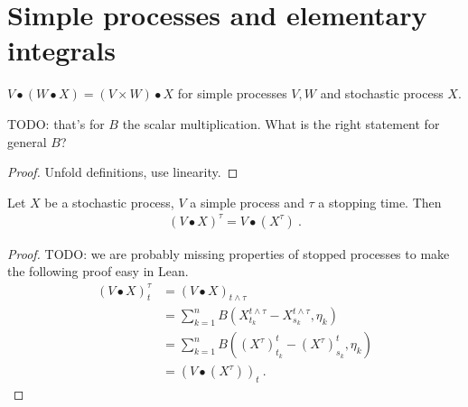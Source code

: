 \chapter{Simple processes and elementary integrals}




































\begin{lemma}\label{lem:elemStochIntegral_assoc}
$V \bullet (W \bullet X) = (V \times W) \bullet X$ for simple processes $V, W$ and stochastic process $X$.

TODO: that's for $B$ the scalar multiplication. What is the right statement for general $B$?
\end{lemma}

\begin{proof}
Unfold definitions, use linearity.
\end{proof}


\begin{lemma}\label{lem:elemStochIntegral_stoppedProcess}
Let $X$ be a stochastic process, $V$ a simple process and $τ$ a stopping time.
Then
\begin{align*}
  (V \bullet X)^τ = V \bullet (X^τ)
  \: .
\end{align*}
\end{lemma}

\begin{proof}
TODO: we are probably missing properties of stopped processes to make the following proof easy in Lean.
\begin{align*}
  (V \bullet X)^\tau_t
  &= (V \bullet X)_{t \wedge \tau}
  \\
  &= \sum_{k=1}^{n} B (X^{t \wedge \tau}_{t_k} - X^{t \wedge \tau}_{s_k}, \eta_k)
  \\
  &= \sum_{k=1}^{n} B ((X^{\tau})^t_{t_k} - (X^{\tau})^t_{s_k}, \eta_k)
  \\
  &= (V \bullet (X^{\tau}))_t
  \: .
\end{align*}
\end{proof}


